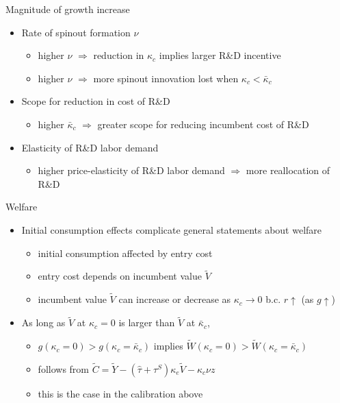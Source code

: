 \documentclass[english,usenames,dvipsnames]{beamer}
\begin{document}
\begin{frame}{Magnitude of growth increase}\label{magnitude_of_growth_increase}
	\hyperlink{policy:magnitudeOfGrowthIncrease}{}
	\begin{itemize}
		\item  Rate of spinout formation $\nu$
		\begin{itemize}
			\item higher $\nu$ $\Rightarrow$ reduction in $\kappa_c$ implies larger R\&D incentive
			\item higher $\nu$ $\Rightarrow$ more spinout innovation lost when $\kappa_c < \bar{\kappa}_c$ 
		\end{itemize}
		\medskip
		\item  Scope for reduction in cost of R\&D
		\begin{itemize}
			\item higher $\bar{\kappa}_c$ $\Rightarrow$ greater scope for reducing incumbent cost of R\&D
		\end{itemize}
		\medskip
		\item  Elasticity of R\&D labor demand 
		\begin{itemize}
			\item higher price-elasticity of R\&D labor demand $\Rightarrow$ more reallocation of R\&D
		\end{itemize}
	\end{itemize}
\end{frame}

\begin{frame}{Welfare}\label{welfare_details}
	\hyperlink{reducing_kappa_c_table}{}
	\begin{itemize}
		\item Initial consumption effects complicate general statements about welfare
		\begin{itemize}
			\item initial consumption affected by entry cost
			\item entry cost depends on incumbent value $\tilde{V}$ 
			\item incumbent value $\tilde{V}$ can increase or decrease as $\kappa_c \to 0$ b.c. $r \uparrow$ (as $g \uparrow$)
		\end{itemize}
		\medskip
		\item As long as $\tilde{V}$ at $\kappa_c = 0$ is larger than $\tilde{V}$ at $\bar{\kappa}_c$,
		\begin{itemize}
			\item $g(\kappa_c = 0) > g(\kappa_c = \bar{\kappa}_c)$ implies $\tilde{W}(\kappa_c = 0) > \tilde{W}(\kappa_c = \bar{\kappa}_c)$
			\smallskip
			\item follows from $\tilde{C} = \tilde{Y} - (\hat{\tau} + \tau^S)\kappa_e \tilde{V} - \kappa_c \nu z$
			\item this is the case in the calibration above
		\end{itemize}
	\end{itemize}
\end{frame}
\end{document}
